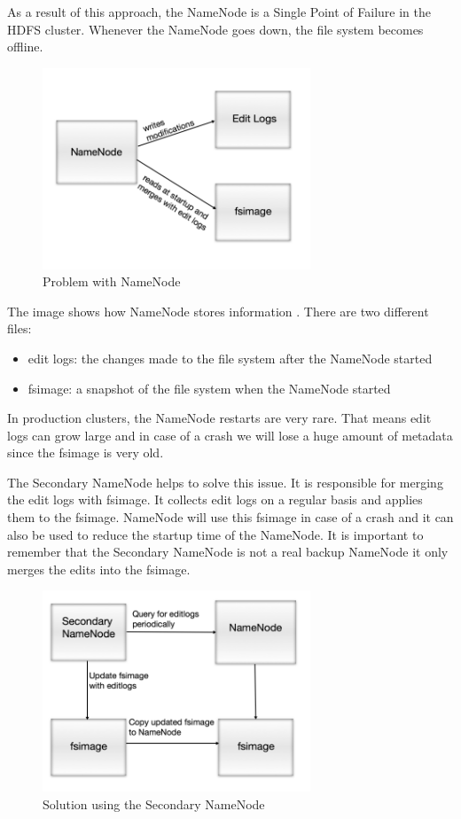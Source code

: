 As a result of this approach, the NameNode is a Single Point of Failure in the HDFS cluster. Whenever the NameNode goes down, the file system becomes offline.
\begin{figure}[H]
	\includegraphics[width=80mm, keepaspectratio]{figures/namenode_problem.png}
	\centering
	\caption{Problem with NameNode}
\end{figure}
The image shows how NameNode stores information \cite{Secondary-NameNode}. There are two different files:
\begin{itemize}
	\item edit logs: the changes made to the file system after the NameNode started
	\item fsimage: a snapshot of the file system when the NameNode started
\end{itemize}
In production clusters, the NameNode restarts are very rare. That means edit logs can grow large and in case of a crash we will lose a huge amount of metadata since the fsimage is very old.

The Secondary NameNode helps to solve this issue. It is responsible for merging the edit logs with fsimage. It collects edit logs on a regular basis and applies them to the fsimage. NameNode will use this fsimage in case of a crash and it can also be used to reduce the startup time of the NameNode.
It is important to remember that the Secondary NameNode is not a real backup NameNode it only merges the edits into the fsimage. 

\begin{figure}[H]
	\includegraphics[width=80mm, keepaspectratio]{figures/secondary_namenode.png}
	\centering
	\caption{Solution using the Secondary NameNode}
\end{figure}

